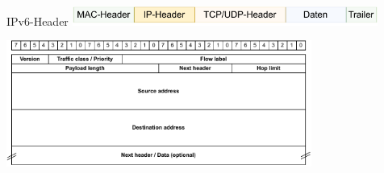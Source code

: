 \begin{defi}{IPv6-Header}
    \centering
    \includegraphics[width=0.75\textwidth]{includes/figures/defi_ip_header_kapselung.pdf}

    \includegraphics[width=0.75\textwidth]{includes/figures/defi_ipv6_header.pdf}
\end{defi}


